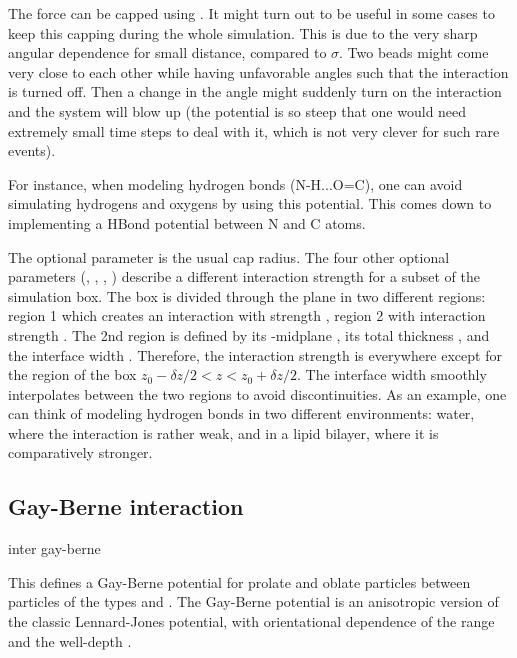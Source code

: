 The force can be capped using . It might turn out
to be useful in some cases to keep this capping during the whole
simulation. This is due to the very sharp angular dependence for small
distance, compared to $\sigma$. Two beads might come very close to each other
while having unfavorable angles such that the interaction is turned off. Then
a change in the angle might suddenly turn on the interaction and the system
will blow up (the potential is so steep that one would need extremely small
time steps to deal with it, which is not very clever for such rare events).

For instance, when modeling hydrogen bonds (N-H...O=C), one can avoid
simulating hydrogens and oxygens by using this potential. This comes down to
implementing a HBond potential between N and C atoms.

The optional parameter  is the usual cap radius. The four
other optional parameters (, , \var{\kappa},
) describe a different interaction strength  for
a subset of the simulation box. The box is divided through the  plane
in two different regions: region 1 which creates an interaction with strength
\var{\epsilon}, region 2 with interaction strength . The 2nd
region is defined by its -midplane , its total thickness
, and the interface width \var{\kappa}. Therefore, the
interaction strength is \var{\epsilon} everywhere except for the region of the
box $z_0-\delta z/2<z<z_0+\delta z/2$. The interface width smoothly
interpolates between the two regions to avoid discontinuities. As an example,
one can think of modeling hydrogen bonds in two different environments: water,
where the interaction is rather weak, and in a lipid bilayer, where it is
comparatively stronger.

\subsection{Gay-Berne interaction}

\begin{essyntax}
  inter   gay-berne
    
    \var{\mu} \var{\nu}
  \begin{features}
  \end{features}
\end{essyntax}
This defines a Gay-Berne potential for prolate and oblate particles
between particles of the types  and . The
Gay-Berne potential is an anisotropic version of the classic
Lennard-Jones potential, with orientational dependence of the range
 and the well-depth .

